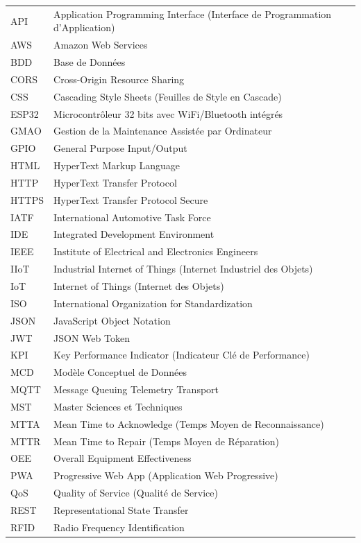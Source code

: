 \begin{longtable}{@{}p{3cm}p{11cm}@{}}
API & Application Programming Interface (Interface de Programmation d'Application) \\
AWS & Amazon Web Services \\
BDD & Base de Données \\
CORS & Cross-Origin Resource Sharing \\
CSS & Cascading Style Sheets (Feuilles de Style en Cascade) \\
ESP32 & Microcontrôleur 32 bits avec WiFi/Bluetooth intégrés \\
GMAO & Gestion de la Maintenance Assistée par Ordinateur \\
GPIO & General Purpose Input/Output \\
HTML & HyperText Markup Language \\
HTTP & HyperText Transfer Protocol \\
HTTPS & HyperText Transfer Protocol Secure \\
IATF & International Automotive Task Force \\
IDE & Integrated Development Environment \\
IEEE & Institute of Electrical and Electronics Engineers \\
IIoT & Industrial Internet of Things (Internet Industriel des Objets) \\
IoT & Internet of Things (Internet des Objets) \\
ISO & International Organization for Standardization \\
JSON & JavaScript Object Notation \\
JWT & JSON Web Token \\
KPI & Key Performance Indicator (Indicateur Clé de Performance) \\
MCD & Modèle Conceptuel de Données \\
MQTT & Message Queuing Telemetry Transport \\
MST & Master Sciences et Techniques \\
MTTA & Mean Time to Acknowledge (Temps Moyen de Reconnaissance) \\
MTTR & Mean Time to Repair (Temps Moyen de Réparation) \\
OEE & Overall Equipment Effectiveness \\
PWA & Progressive Web App (Application Web Progressive) \\
QoS & Quality of Service (Qualité de Service) \\
REST & Representational State Transfer \\
RFID & Radio Frequency Identification \\

\end{longtable}
